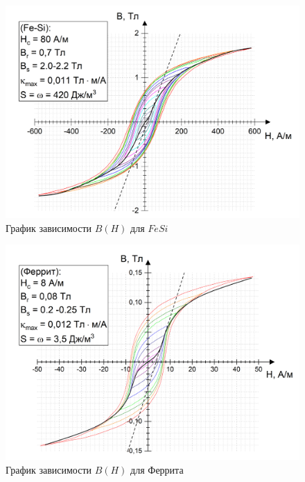 \documentclass[a4paper]{article}%
\begin{document}
\begin{figure}[h!]

	\hspace{-1cm}
	\includegraphics[width=1.05\textwidth]{FeSi.png}
		\vspace{-1.2cm}
	\caption{График зависимости $B(H)$ для $FeSi$}
\end{figure}
\newpage

\begin{figure}[h!]
	\vspace{-1.7cm}
	\hspace{-1cm}
	\includegraphics[width=1.05\textwidth]{Ferrit.png}

	\caption{График зависимости $B(H)$ для Феррита}
\end{figure}
\end{document}
